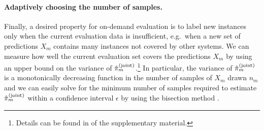 \paragraph{Adaptively choosing the number of samples.}
Finally, a desired property for on-demand evaluation is to label new instances only when the current evaluation data is insufficient,
e.g.\ when a new set of predictions $X_m$ contains many instances not covered by other systems.
We can measure how well the current evaluation set covers the predictions $X_m$ by using an upper bound on the variance of ${\hat{\pi}}_m^{\text{(joint)}}$.\footnote{Details can be found in  of the supplementary material.}
In particular, the variance of ${\hat{\pi}}_m^{\text{(joint)}}$ is a monotonically decreasing function in the number of samples of $X_m$ drawn $n_m$ and we can easily solve for the minimum number of samples required to estimate ${\hat{\pi}}_m^{\text{(joint)}}$ within a confidence interval $\epsilon$ by using the bisection method \citep{burden1985bisection}.
